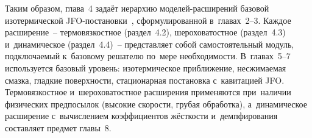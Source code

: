 Таким образом, глава~4 задаёт иерархию моделей-расширений
базовой изотермической JFO-постановки~\cite{hori2002}, сформулированной
в~главах~2--3. Каждое расширение~-- термовязкостное
(раздел~4.2), шероховатостное (раздел~4.3) и~динамическое
(раздел~4.4)~-- представляет собой самостоятельный модуль,
подключаемый к~базовому решателю по~мере необходимости.
В~главах~5--7 используется базовый уровень: изотермическое
приближение, несжимаемая смазка, гладкие поверхности,
стационарная постановка с~кавитацией JFO. Термовязкостное
и~шероховатостное расширения применяются при~наличии физических
предпосылок (высокие скорости, грубая обработка),
а~динамическое расширение с~вычислением коэффициентов
жёсткости и~демпфирования составляет предмет главы~8.
